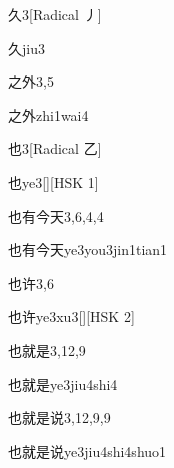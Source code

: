 \begin{entry}{久}{3}[Radical 丿]
  \begin{phonetics}{久}{jiu3}
  \end{phonetics}
\end{entry}

\begin{entry}{之外}{3,5}
  \begin{phonetics}{之外}{zhi1wai4}
  \end{phonetics}
\end{entry}

\begin{entry}{也}{3}[Radical 乙]
  \begin{phonetics}{也}{ye3}[][HSK 1]
  \end{phonetics}
\end{entry}

\begin{entry}{也有今天}{3,6,4,4}
  \begin{phonetics}{也有今天}{ye3you3jin1tian1}
  \end{phonetics}
\end{entry}

\begin{entry}{也许}{3,6}
  \begin{phonetics}{也许}{ye3xu3}[][HSK 2]
  \end{phonetics}
\end{entry}

\begin{entry}{也就是}{3,12,9}
  \begin{phonetics}{也就是}{ye3jiu4shi4}
  \end{phonetics}
\end{entry}

\begin{entry}{也就是说}{3,12,9,9}
  \begin{phonetics}{也就是说}{ye3jiu4shi4shuo1}
  \end{phonetics}
\end{entry}

